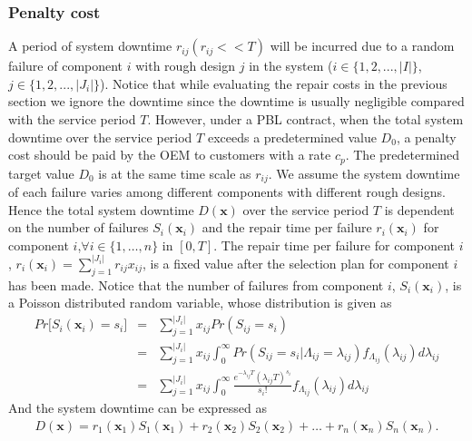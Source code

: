 \documentclass[preprint,12pt]{elsarticle}
\begin{document}
\subsubsection{Penalty cost}
A period of system downtime $r_{ij}(r_{ij}<<T)$ will be incurred due to a random failure of component $i$ with rough design $j$ in the system ($i \in \{1,2,...,\rvert I \lvert \}$, $j \in \{1,2,...,\rvert J_{i} \lvert \}$). Notice that while evaluating the repair costs in the previous section we ignore the downtime since the downtime is usually negligible compared with the service period $T$. However, under a PBL contract, when the total system downtime over the service period $T$ exceeds a predetermined value $D_0$, a penalty cost should be paid by the OEM to customers with a rate $c_p$. The predetermined target value $D_0$ is at the same time scale as $r_{ij}$. We assume the system downtime of each failure varies among different components with different rough designs. Hence the total system downtime $D{(\boldsymbol{x})}$ over the service period $T$ is dependent on the number of failures $S_{i}(\boldsymbol{x}_{i})$ and the repair time per failure $r_{i}(\boldsymbol{x}_{i})$ for component $i$,$\forall i\in \{1,\dots,n\}$ in $[0,T]$. The repair time per failure for component $i$, $r_{i}(\boldsymbol{x}_{i})=\sum_{j=1}^{\rvert J_{i} \lvert}{r_{ij}x_{ij}}$, is a fixed value after the selection plan for component $i$ has been made. Notice that the number of failures from component $i$, $S_{i}(\boldsymbol{x}_{i})$, is a Poisson distributed random variable, whose distribution is given as
\begin{eqnarray}
Pr\bigg[S_{i}(\boldsymbol{x}_{i})=s_{i}\bigg] &=&\sum^{\rvert J_{i} \lvert}_{j=1}{x_{ij}Pr(S_{ij}=s_{i})} \nonumber\\
&=&\sum^{\rvert J_{i} \lvert}_{j=1}{x_{ij}\int^{\infty}_{0}Pr(S_{ij}=s_{i}|\Lambda_{ij}=\lambda_{ij})f_{\Lambda_{ij}}(\lambda_{ij})d\lambda_{ij}} \nonumber\\
&=&\sum^{\rvert J_{i} \lvert}_{j=1}{x_{ij}\int^{\infty}_{0}{\frac{e^{-\lambda_{ij}T}(\lambda_{ij}T)^{s_{i}}}{s_{i}!}f_{\Lambda_{ij}}(\lambda_{ij})}d\lambda_{ij}}
\end{eqnarray}
And the system downtime can be expressed as
\begin{eqnarray}
D(\boldsymbol{x})= r_{1}(\boldsymbol{x}_{1})S_{1}(\boldsymbol{x}_{1})+r_{2}(\boldsymbol{x}_{2})S_{2}(\boldsymbol{x}_{2})+\ldots+r_{n}(\boldsymbol{x}_{n})S_{n}(\boldsymbol{x}_{n}).
\label{D}
\end{eqnarray}
\end{document}
